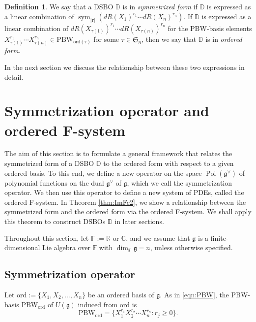 \documentclass[a4paper,11pt,reqno]{amsart}
\newcommand{\frakg}{\mathfrak{g}}
\newcommand{\DD}{\mathbb{D}}
\newcommand{\0}{{\bf 0}}
\newcommand{\R}{\mathbb{R}}
\newcommand{\C}{\mathbb{C}}
\newcommand{\F}{\mathbb{F}}
\newcommand{\1}{{\bf 1}}
\DeclareMathOperator{\Pol}{Pol}
\newcommand{\ord}{{\mathrm{ord}}}
\DeclareMathOperator{\sym}{sym}
\theoremstyle{plain}
\theoremstyle{definition}
\newtheorem{definition}[equation]{Definition}
\numberwithin{equation}{section}
\theoremstyle{definition}
\begin{document}
\begin{definition}\label{def:symmetrized-ordered-forms}
We say that a DSBO $\mathbb{D}$ is in 
\emph{symmetrized form} if $\mathbb{D}$ is expressed as  a linear combination of 
$\sym_{|\mathbf{r}|}(dR(X_1)^{r_1}\cdots dR(X_n)^{r_n})$.
If $\mathbb{D}$ is expressed as a linear combination of
$dR(X_{\tau(1)})^{r_1}\cdots dR(X_{\tau(n)})^{r_n}$
for the PBW-basis elements $X_{\tau(1)}^{r_1}\cdots X_{\tau(n)}^{r_n}
\in \mathrm{PBW}_{\ord(\tau)}$ for some $\tau \in \mathfrak{S}_n$,
then we say that $\mathbb{D}$ is in \emph{ordered form}.
\end{definition}

In the next section we discuss the relationship between these two expressions
in detail.
\section{Symmetrization operator and ordered F-system}
\label{sec:nonsym}

The aim of this section is to formulate a general framework that 
relates the symmetrized form of a DSBO $\DD$
to the ordered form with respect to a given ordered basis. 
To this end, we define a new  operator on the space $\Pol(\frakg^\vee)$ 
of polynomial functions on the dual $\frakg^\vee$ of $\frakg$, which we call the symmetrization operator.
We then use this operator to define a new system of PDEs, called
the ordered F-system.
In Theorem \ref{thm:ImFc2}, we show a relationship between
the symmetrized form and the ordered form via the ordered F-system.
We shall apply this theorem to construct DSBOs $\DD$ in later sections.

Throughout this section, let $\F:=\R$ or $\C$, and we assume that 
$\frakg$ is a finite-dimensional Lie algebra over $\F$ 
with $\dim_\F \frakg =n$, unless otherwise specified. 

\subsection{Symmetrization operator}

Let  
$\ord:=\{X_1,X_2,\ldots, X_n\}$ 
be an ordered basis of $\frakg$.
As in \eqref{eqn:PBW},
the PBW-basis $\mathrm{PBW}_\ord$ of $U(\frakg)$ induced from
$\ord$ is 
\begin{equation*}
\mathrm{PBW}_\ord =\{X_1^{r_1}X_2^{r_2}\cdots X_n^{r_n}: r_j\geq 0\}.
\end{equation*}
\end{document}
